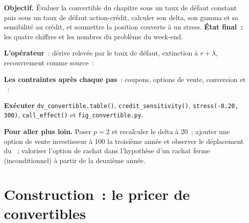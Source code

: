 \begin{tutorial}
\textbf{Objectif.} Évaluer la convertible du chapitre sous un taux de défaut constant puis sous un taux de défaut action-crédit, calculer son delta, son gamma et sa sensibilité au crédit,
et soumettre la position couverte à un stress. \textbf{État final~:} les quatre chiffres et les nombres du problème du week-end.
\begin{tutsteps}
\item \textbf{L'opérateur}~: dérive relevée par le taux de défaut, extinction à $r+\lambda$, recouvrement comme source~:
\label{lst:dv:convertibles-and-the-credit-equity-link:operator}
\item \textbf{Les contraintes après chaque pas}~: coupons, options de vente, conversion et ~:
\label{lst:dv:convertibles-and-the-credit-equity-link:constraints}
\item \textbf{Exécuter} \texttt{dv\_convertible.table()}, \texttt{credit\_sensitivity()}, \texttt{stress(-0.20, 300)}, \texttt{call\_effect()} et
\texttt{fig\_convertible.py}.
\end{tutsteps}
\textbf{Pour aller plus loin.} Poser $p=2$ et recalculer le delta à 20~; ajouter une option de vente investisseur à 100 la troisième année et observer le déplacement du ~; valoriser
l'option de rachat dans l'hypothèse d'un rachat ferme (inconditionnel) à partir de la deuxième année.
\end{tutorial}

\section{Construction~: le pricer de convertibles}\label{bld:dv:convertibles-and-the-credit-equity-link:convertible}

